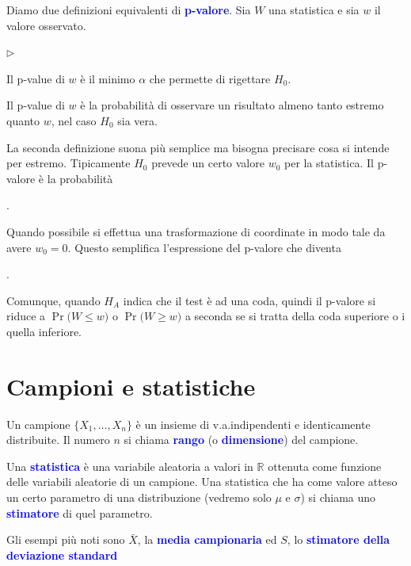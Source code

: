 \documentclass[12pt,openany]{book}
\def\RR{\mathds R}
\newcommand{\mylabel}[1]{{\footnotesize\textsf{#1}}\hfill}
\renewenvironment{itemize}
  {\begin{list}{$\triangleright$}{%
   \setlength{\parskip}{0mm}
   \setlength{\topsep}{.2\baselineskip}
   \setlength{\rightmargin}{0mm}
   \setlength{\listparindent}{0mm}
   \setlength{\itemindent}{0mm}
   \setlength{\labelwidth}{3ex}
   \setlength{\itemsep}{.4\baselineskip}
   \setlength{\parsep}{0mm}
   \setlength{\partopsep}{0mm}
   \setlength{\labelsep}{1ex}
   \setlength{\leftmargin}{\labelwidth+\labelsep}
   \let\makelabel\mylabel}}{%
   \end{list}\vspace*{-1.3mm}}
\def\emph#1{\textcolor{blue}{\textbf{\boldmath #1}}}
\theoremstyle{mio}
\theoremstyle{liscio}
\begin{document}
Diamo due definizioni equivalenti di \emph{p-valore}. Sia $W$ una statistica e sia $w$ il valore osservato. 


\begin{itemize}
\item Il p-value di $w$ è il minimo $\alpha$ che permette di rigettare $H_0$.

\item Il p-value di $w$ è la probabilità di osservare un risultato almeno tanto estremo quanto $w$, nel caso $H_0$ sia vera. 
\end{itemize}

La seconda definizione suona più semplice ma bisogna precisare cosa si intende per estremo. Tipicamente $H_0$ prevede un certo valore $w_0$ per la statistica. Il p-valore è la probabilità 

\ceq{\hfill \emph{p-valore}}{=}{\Pr\big(|W-w_0|\ge |w-w_0|\big)}

. 

Quando possibile si effettua una trasformazione di coordinate in modo tale da avere $w_0=0$. Questo semplifica l'espressione del p-valore che diventa 

.

Comunque, quando $H_A$ indica che il test è ad una coda, quindi il p-valore si riduce a $\Pr\big(W\le w\big)$ o $\Pr\big(W\ge w\big)$ a seconda se si tratta della coda superiore o i quella inferiore.



\hfill{}\clearpage\section{Campioni e statistiche}

Un campione $\{X_1,\dots,X_n\}$ è un insieme di v.a.\@ indipendenti e identicamente distribuite. Il numero $n$ si chiama \emph{rango\/} (o \emph{dimensione\/}) del campione. 

Una \emph{statistica\/} è una variabile aleatoria a valori in $\RR$ ottenuta come funzione delle variabili aleatorie di un campione. Una statistica che ha come valore atteso un certo parametro di una distribuzione (vedremo solo $\mu$ e $\sigma$) si chiama uno  \emph{stimatore\/} di quel parametro.

Gli esempi più noti sono $\bar X$, la \emph{media campionaria\/} ed $S$, lo \emph{stimatore della deviazione standard\/} 
\end{document}
